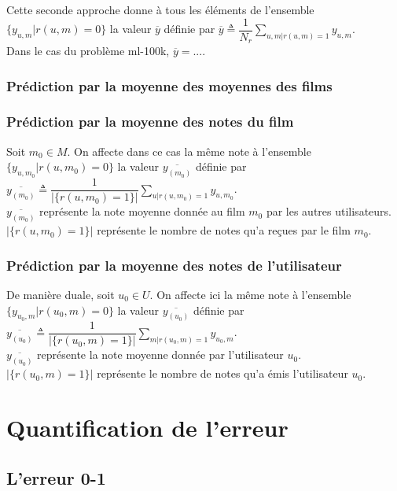 \documentclass[a4paper, 11pt]{article}
\begin{document}
Cette seconde approche donne à tous les éléments de l'ensemble $\{y_{u,m} \vert r(u,m) =0 \}$ la valeur $\overline{y}$ définie par $\overline{y} \triangleq \displaystyle \dfrac{1}{N_r} \sum \limits_{u,m \vert r(u,m)=1} y_{u,m}$. \\
Dans le cas du problème ml-100k, $\overline{y} = ...$.

\subsubsection{Prédiction par la moyenne des moyennes des films}

\subsubsection{Prédiction par la moyenne des notes du film}

Soit $m_0 \in M$. On affecte dans ce cas la même note à l'ensemble $\{y_{u,m_0} \vert r(u,m_0)=0 \}$ la valeur $\overline{y_{(m_0)}}$ définie par $\overline{y_{(m_0)}} \triangleq  \displaystyle \dfrac{1}{\vert \{ r(u,m_0) = 1\} \vert } \sum \limits_{u \vert r(u,m_0)=1} y_{u,m_0}$. \\
$\overline{y_{(m_0)}}$ représente la note moyenne donnée au film $m_0$ par les autres utilisateurs. \\
$\vert \{ r(u,m_0) = 1\} \vert$ représente le nombre de notes qu'a reçues par le film $m_0$.
 
\subsubsection{Prédiction par la moyenne des notes de l'utilisateur}

De manière duale, soit $u_0 \in U$. On affecte ici la même note à l'ensemble $\{y_{u_0,m} \vert r(u_0,m)=0 \}$ la valeur $\overline{y_{(u_0)}}$ définie par $\overline{y_{(u_0)}} \triangleq \displaystyle \dfrac{1}{\vert \{ r(u_0,m) = 1\}\vert} \sum \limits_{m \vert r(u_0,m)=1} y_{u_0,m}$. \\
$\overline{y_{(u_0)}}$ représente la note moyenne donnée par l'utilisateur $u_0$. \\
$\vert \{ r(u_0,m) = 1\}\vert$ représente le nombre de notes qu'a émis l'utilisateur $u_0$.

\section{Quantification de l'erreur}

\subsection{L'erreur 0-1}
\end{document}
